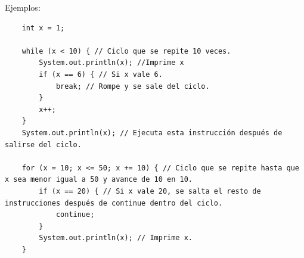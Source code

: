 Ejemplos:
\begin{lstlisting}
    int x = 1;
    
    while (x < 10) { // Ciclo que se repite 10 veces.
        System.out.println(x); //Imprime x
        if (x == 6) { // Si x vale 6.
            break; // Rompe y se sale del ciclo.
        }
        x++;
    }  
    System.out.println(x); // Ejecuta esta instrucción después de salirse del ciclo.
    
    for (x = 10; x <= 50; x += 10) { // Ciclo que se repite hasta que x sea menor igual a 50 y avance de 10 en 10.
        if (x == 20) { // Si x vale 20, se salta el resto de instrucciones después de continue dentro del ciclo.
            continue;
        }
        System.out.println(x); // Imprime x.
    }
\end{lstlisting}



